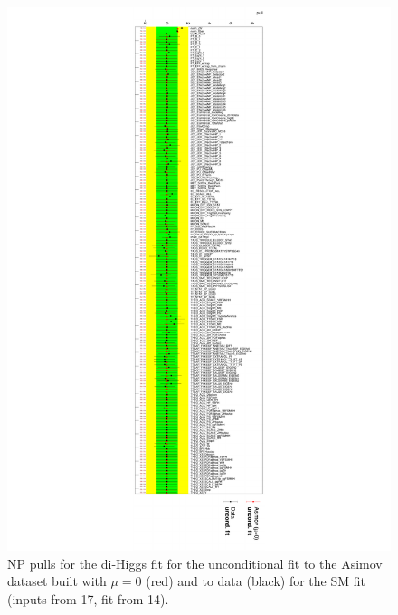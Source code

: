 \begin{figure}
\centering
\includegraphics[width=.9\textwidth]{figures/results/HH/HadHad/HadHadFit14072021/PullsAndRankings/NP_allExceptGammas_SM.pdf}
\caption{NP pulls for the di-Higgs \hadhad fit for the unconditional  fit to the Asimov dataset built with $\mu=0$ (red) and to data (black) for the SM fit (inputs from 17, fit from 14).}
\label{fig:HadHadPostfitNPPullsSM}
\end{figure}

